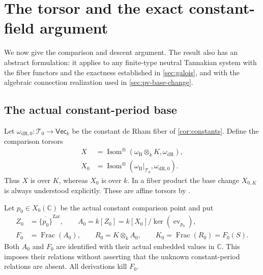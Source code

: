 \documentclass[11pt]{article}
\numberwithin{equation}{section}
\theoremstyle{definition}
\theoremstyle{remark}
\newcommand{\C}{\mathbb C}
\newcommand{\Tcal}{\mathcal T}
\newcommand{\VecCat}{\mathsf{Vec}}
\newcommand{\Isom}{\operatorname{Isom}}
\newcommand{\Frac}{\operatorname{Frac}}
\newcommand{\dR}{\mathrm{dR}}
\newcommand{\B}{\mathrm B}
\begin{document}
\section{The torsor and the exact constant-field argument}\label{sec:torsor}\label{sec:periods}

We now give the comparison and descent argument. The result also has
an abstract formulation: it applies to
any finite-type neutral Tannakian system with the fiber functors and the
exactness established in \cref{sec:galois}, and with the algebraic
connection realization used in \cref{sec:pv-base-change}.

\subsection{The actual constant-period base}

Let $\omega_{\dR,0}:\Tcal_0\to\VecCat_k$ be the constant de Rham fiber
of \cref{cor:constants}. Define the comparison torsors
\begin{align*}
 X&=\Isom^\otimes(\omega_\B\otimes_k K,\omega_\dR),\\
 X_0&=\Isom^\otimes(\omega_\B|_{\Tcal_0},\omega_{\dR,0}).
\end{align*}
Thus $X$ is over $K$, whereas $X_0$ is over $k$. In a fiber product the
base change $X_{0,K}$ is always understood explicitly. These are affine
torsors by \cite[Theorem~3.2]{DeligneMilne}.

Let $p_0\in X_0(\C)$ be the actual constant comparison point and put
\begin{equation}\label{eq:actual-base}
 \begin{split}
 Z_0&=\overline{\{p_0\}}^{\mathrm{Zar}},\qquad
 A_0=k[Z_0]=k[X_0]/\ker(\operatorname{ev}_{p_0}),\\
 F_0&=\Frac(A_0),\qquad R_0=K\otimes_k A_0,\qquad
 K_0=\Frac(R_0)=F_0(S).
 \end{split}
\end{equation}
Both $A_0$ and $F_0$ are identified with their actual embedded values in
$\C$. This imposes their relations without asserting that the unknown
constant-period relations are absent. All derivations kill $F_0$.
\end{document}
